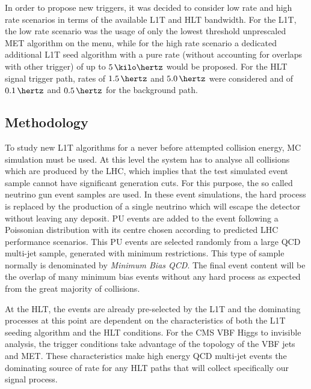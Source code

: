 In order to propose new triggers, it was decided to consider low rate and high rate scenarios in terms of the available \gls{L1T} and \gls{HLT} bandwidth. For the \gls{L1T}, the low rate scenario was the usage of only the lowest threshold unprescaled \gls{MET} algorithm on the menu, while for the high rate scenario a dedicated additional \gls{L1T} seed algorithm with a pure rate (without accounting for overlaps with other trigger) of up to $5\,\kilo\hertz$ would be proposed. For the \gls{HLT} signal trigger path, rates of $1.5\,\hertz$ and $5.0\,\hertz$ were considered and of $0.1\,\hertz$ and $0.5\,\hertz$ for the background path.

\subsection{Methodology}
\label{SECTION:RunIITriggerStudies_Methodology}


To study new \gls{L1T} algorithms for a never before attempted collision energy, \gls{MC} simulation must be used. At this level the system has to analyse all collisions which are produced by the \gls{LHC}, which implies that the test simulated event sample cannot have significant generation cuts. For this purpose, the so called neutrino gun event samples are used. In these event simulations, the hard process is replaced by the production of a single neutrino which will escape the detector without leaving any deposit. \acrfull{PU} events are added to the event following a Poissonian distribution with its centre chosen according to predicted \gls{LHC} performance scenarios. This \gls{PU} events are selected randomly from a large \gls{QCD} multi-jet sample, generated with minimum restrictions. This type of sample normally is denominated by \textit{Minimum Bias \gls{QCD}}. The final event content will be the overlap of many minimum bias events without any hard process as expected from the great majority of collisions.

At the \gls{HLT}, the events are already pre-selected by the \gls{L1T} and the dominating processes at this point are dependent on the characteristics of both the \gls{L1T} seeding algorithm and the \gls{HLT} conditions. For the \gls{CMS} \gls{VBF} Higgs to invisible analysis, the trigger conditions take advantage of the topology of the \gls{VBF} jets and \gls{MET}. These characteristics make high energy \gls{QCD} multi-jet events the dominating source of rate for any \gls{HLT} paths that will collect specifically our signal process.

